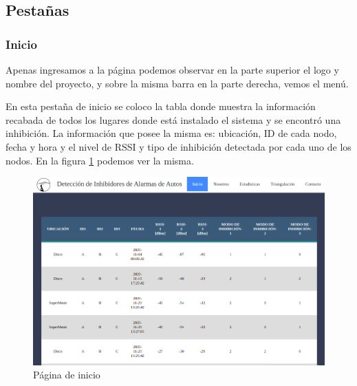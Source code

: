 \subsection{Pestañas}
\subsubsection{Inicio}
Apenas ingresamos a la página podemos observar en la parte superior el logo y nombre del proyecto, y sobre la misma barra en la parte derecha, vemos el menú.
\par En esta pestaña de inicio se coloco la tabla donde muestra la información recabada de todos los lugares donde está instalado el sistema y se encontró una inhibición. La información que posee la misma es: ubicación, ID de cada nodo, fecha y hora y el nivel de RSSI y tipo de inhibición detectada por cada uno de los nodos. En la figura \ref{web_inicio} podemos ver la misma. 
\begin{figure}[h!]
	\centering
	\includegraphics[scale=0.3]{images/web/tabla-web.png}
    \caption{Página de inicio}
	\label{web_inicio}
\end{figure}
